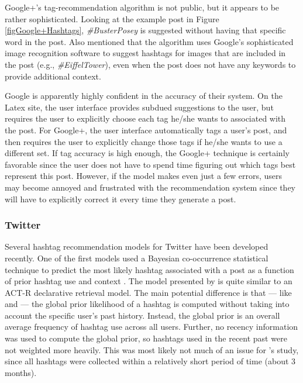 \documentclass[man,floatsintext,donotrepeattitle]{apa6}
\begin{document}
Google+'s tag-recommendation algorithm is not public, but it appears to be rather sophisticated.
Looking at the example post in Figure \ref{figGoogle+Hashtags}, \emph{\#BusterPosey} is suggested without having that specific word in the post.
Also \textcite{GoogleKeynote2013} mentioned that the algorithm uses Google's sophisticated image recognition software to suggest hashtags for images that are included in the post (e.g., \emph{\#EiffelTower}),
even when the post does not have any keywords to provide additional context.

Google is apparently highly confident in the accuracy of their system.
On the Latex site, the user interface provides subdued suggestions to the user, but requires the user to explicitly choose each tag he/she wants to associated with the post.
For Google+, the user interface automatically tags a user's post, and then requires the user to explicitly change those tags if he/she wants to use a different set.
If tag accuracy is high enough, the Google+ technique is certainly favorable since the user does not have to spend time figuring out which tags best represent this post.
However, if the model makes even just a few errors, users may become annoyed and frustrated with the recommendation system since they will have to explicitly correct it every time they generate a post.

\subsubsection{Twitter}

Several hashtag recommendation models for Twitter have been developed recently.
One of the first models used a Bayesian co-occurrence statistical technique to predict the most likely hashtag associated with a post as a function of prior hashtag use and context \parencite{Mazzia2009}.
The model presented by \textcite{Mazzia2009} is quite similar to an ACT-R declarative retrieval model.
The main potential difference is that --- like \textcite{Kuo2011} and \textcite{Stanley2013} --- the global prior likelihood of a hashtag is computed without taking into account the specific user's past history.
Instead, the global prior is an overall average frequency of hashtag use across all users.
Further, no recency information was used to compute the global prior, so hashtags used in the recent past were not weighted more heavily. 
This was most likely not much of an issue for 's study, since all hashtags were collected within a relatively short period of time (about 3 months).
\end{document}
